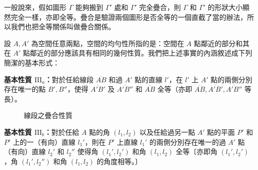 一般說來，假如圖形 $\varGamma$ 能夠搬到 $\varGamma'$ 處和 $\varGamma'$ 完全疊合，則 $\varGamma$ 和 $\varGamma'$ 的形狀大小顯然完全一樣，亦即全等。疊合是驗證兩個圖形是否全等的一個直截了當的辦法，所以我們也把全等關係叫做疊合關係。

設 $A, A'$ 為空間任意兩點，空間的均勻性所指的是：空間在 $A$ 點鄰近的部分和其在 $A'$ 點鄰近的部分應該具有相同的幾何性質。我們把上述事實的內涵敘述成下列簡潔的基本形式：

\noindent\textbf{基本性質 $\mathrm{III}_a$：}對於任給線段 $\overline{AB}$ 和過 $A'$ 點的直線 $l'$，在 $l'$ 上 $A'$ 點的兩側分別存在唯一的點 $B', B''$，使得 $\overline{A'B'}$ 及 $\overline{A'B''}$ 和 $\overline{AB}$ 全等（亦即 $\overline{AB}, \overline{A'B'}, \overline{A'B''}$ 等長）。

\begin{figure}[H]
\centering
{}
\caption{線段之疊合性質}
\label{fig:b3-a1-14}
\end{figure}

\noindent\textbf{基本性質 $\mathrm{III}_b$：}對於任給 $A$ 點的角 $(l_1, l_2)$ 以及任給過另一點 $A'$ 點的平面 $P'$ 和 $P'$ 上的一（有向）直線 $l_1'$，則在 $P'$ 上直線 $l_1'$ 的兩側分別存在唯一的過 $A'$ 點（有向）直線 $l_2'$ 和 $l_2''$ 使得角 $(l_1', l_2')$ 和角 $(l_1, l_2)$ 全等〔亦即角 $(l_1', l_2')$，角 $(l_1', l_2'')$ 和角 $(l_1, l_2)$ 的角度相等。〕

